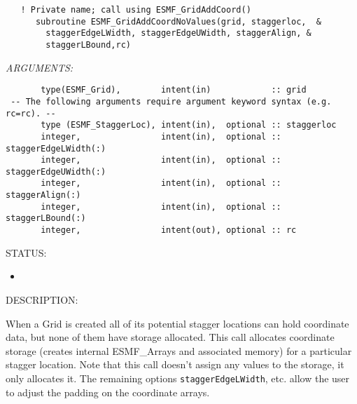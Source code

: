  
\begin{verbatim}   ! Private name; call using ESMF_GridAddCoord()
      subroutine ESMF_GridAddCoordNoValues(grid, staggerloc,  &
        staggerEdgeLWidth, staggerEdgeUWidth, staggerAlign, &
        staggerLBound,rc)
 \end{verbatim}{\em ARGUMENTS:}
\begin{verbatim}       type(ESMF_Grid),        intent(in)            :: grid
 -- The following arguments require argument keyword syntax (e.g. rc=rc). --
       type (ESMF_StaggerLoc), intent(in),  optional :: staggerloc
       integer,                intent(in),  optional :: staggerEdgeLWidth(:)
       integer,                intent(in),  optional :: staggerEdgeUWidth(:)
       integer,                intent(in),  optional :: staggerAlign(:)
       integer,                intent(in),  optional :: staggerLBound(:)
       integer,                intent(out), optional :: rc\end{verbatim}
{\sf STATUS:}
   \begin{itemize}
   \item{}
   \end{itemize}
  
{\sf DESCRIPTION:\\ }


  
    When a Grid is created all of its potential stagger locations can hold coordinate
    data, but none of them have storage allocated. This call allocates coordinate
    storage (creates internal ESMF\_Arrays and associated memory) for  a particular
    stagger location. Note that this
    call doesn't assign any values to the storage, it only allocates it. The
    remaining options {\tt staggerEdgeLWidth}, etc. allow the user to adjust the
    padding on the coordinate arrays.
  
